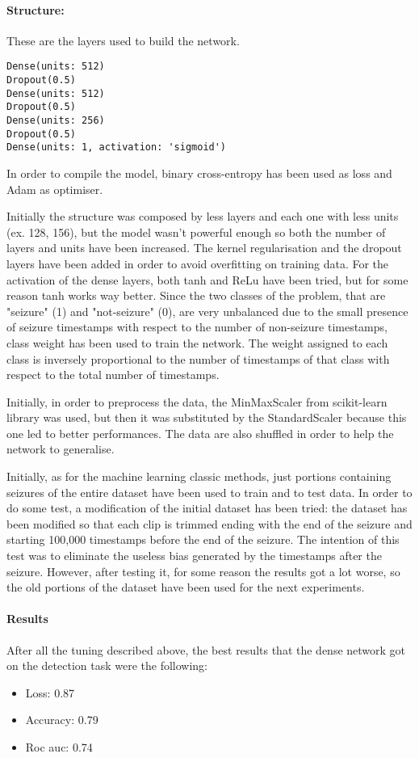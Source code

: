 \paragraph{Structure:} These are the layers used to build the network.
\begin{lstlisting}
Dense(units: 512)
Dropout(0.5)
Dense(units: 512)
Dropout(0.5)
Dense(units: 256)
Dropout(0.5)
Dense(units: 1, activation: 'sigmoid')
\end{lstlisting}

In order to compile the model, binary cross-entropy has been used as loss and Adam as optimiser.

Initially the structure was composed by less layers and each one with less units (ex. 128, 156), but the model wasn't powerful enough so both the number of layers and units have been increased. The kernel regularisation and the dropout layers have been added in order to avoid overfitting on training data. For the activation of the dense layers, both tanh and ReLu have been tried, but for some reason tanh works way better. Since the two classes of the problem, that are "seizure" (1) and "not-seizure" (0), are very unbalanced due to the small presence of seizure timestamps with respect to the number of non-seizure timestamps, class weight has been used to train the network. The weight assigned to each class is inversely proportional to the number of timestamps of that class with respect to the total number of timestamps.

Initially, in order to preprocess the data, the MinMaxScaler from scikit-learn library was used, but then it was substituted by the StandardScaler because this one led to better performances. The data are also shuffled in order to help the network to generalise.

Initially, as for the machine learning classic methods, just portions containing seizures of the entire dataset have been used to train and to test data. In order to do some test, a modification of the initial dataset has been tried: the dataset has been modified so that each clip is trimmed ending with the end of the seizure and starting 100,000 timestamps before the end of the seizure. The intention of this test was to eliminate the useless bias generated by the timestamps after the seizure. However, after testing it, for some reason the results got a lot worse, so the old portions of the dataset have been used for the next experiments.

\paragraph{Results} After all the tuning described above, the best results that the dense network got on the detection task were the following:
\begin{itemize}
    \item Loss: 0.87
    \item Accuracy: 0.79
    \item Roc auc: 0.74
\end{itemize}

